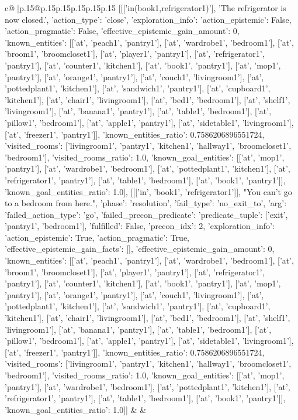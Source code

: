 \documentclass{article}
\begin{document}
{\begin{supertabular}{c@{$\;$}|p{.15\linewidth}@{}p{.15\linewidth}p{.15\linewidth}p{.15\linewidth}p{.15\linewidth}p{.15\linewidth}}
{{{	 [[['in(book1,refrigerator1)'], 'The refrigerator is now closed.', {'action_type': 'close', 'exploration_info': {'action_epistemic': False, 'action_pragmatic': False, 'effective_epistemic_gain_amount': 0, 'known_entities': [['at', 'peach1', 'pantry1'], ['at', 'wardrobe1', 'bedroom1'], ['at', 'broom1', 'broomcloset1'], ['at', 'player1', 'pantry1'], ['at', 'refrigerator1', 'pantry1'], ['at', 'counter1', 'kitchen1'], ['at', 'book1', 'pantry1'], ['at', 'mop1', 'pantry1'], ['at', 'orange1', 'pantry1'], ['at', 'couch1', 'livingroom1'], ['at', 'pottedplant1', 'kitchen1'], ['at', 'sandwich1', 'pantry1'], ['at', 'cupboard1', 'kitchen1'], ['at', 'chair1', 'livingroom1'], ['at', 'bed1', 'bedroom1'], ['at', 'shelf1', 'livingroom1'], ['at', 'banana1', 'pantry1'], ['at', 'table1', 'bedroom1'], ['at', 'pillow1', 'bedroom1'], ['at', 'apple1', 'pantry1'], ['at', 'sidetable1', 'livingroom1'], ['at', 'freezer1', 'pantry1']], 'known_entities_ratio': 0.7586206896551724, 'visited_rooms': ['livingroom1', 'pantry1', 'kitchen1', 'hallway1', 'broomcloset1', 'bedroom1'], 'visited_rooms_ratio': 1.0, 'known_goal_entities': [['at', 'mop1', 'pantry1'], ['at', 'wardrobe1', 'bedroom1'], ['at', 'pottedplant1', 'kitchen1'], ['at', 'refrigerator1', 'pantry1'], ['at', 'table1', 'bedroom1'], ['at', 'book1', 'pantry1']], 'known_goal_entities_ratio': 1.0}}], [[['in', 'book1', 'refrigerator1']], "You can't go to a bedroom from here.", {'phase': 'resolution', 'fail_type': 'no_exit_to', 'arg': {'failed_action_type': 'go', 'failed_precon_predicate': {'predicate_tuple': ['exit', 'pantry1', 'bedroom1'], 'fulfilled': False, 'precon_idx': 2}}, 'exploration_info': {'action_epistemic': True, 'action_pragmatic': True, 'effective_epistemic_gain_facts': [], 'effective_epistemic_gain_amount': 0, 'known_entities': [['at', 'peach1', 'pantry1'], ['at', 'wardrobe1', 'bedroom1'], ['at', 'broom1', 'broomcloset1'], ['at', 'player1', 'pantry1'], ['at', 'refrigerator1', 'pantry1'], ['at', 'counter1', 'kitchen1'], ['at', 'book1', 'pantry1'], ['at', 'mop1', 'pantry1'], ['at', 'orange1', 'pantry1'], ['at', 'couch1', 'livingroom1'], ['at', 'pottedplant1', 'kitchen1'], ['at', 'sandwich1', 'pantry1'], ['at', 'cupboard1', 'kitchen1'], ['at', 'chair1', 'livingroom1'], ['at', 'bed1', 'bedroom1'], ['at', 'shelf1', 'livingroom1'], ['at', 'banana1', 'pantry1'], ['at', 'table1', 'bedroom1'], ['at', 'pillow1', 'bedroom1'], ['at', 'apple1', 'pantry1'], ['at', 'sidetable1', 'livingroom1'], ['at', 'freezer1', 'pantry1']], 'known_entities_ratio': 0.7586206896551724, 'visited_rooms': ['livingroom1', 'pantry1', 'kitchen1', 'hallway1', 'broomcloset1', 'bedroom1'], 'visited_rooms_ratio': 1.0, 'known_goal_entities': [['at', 'mop1', 'pantry1'], ['at', 'wardrobe1', 'bedroom1'], ['at', 'pottedplant1', 'kitchen1'], ['at', 'refrigerator1', 'pantry1'], ['at', 'table1', 'bedroom1'], ['at', 'book1', 'pantry1']], 'known_goal_entities_ratio': 1.0}}]] 
	  } 
	   } 
	   } 
	 & & \\ 
 


\end{supertabular}}
\end{document}
